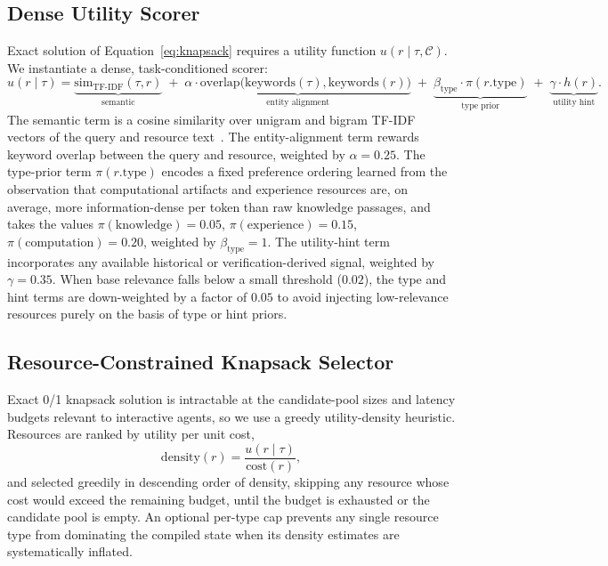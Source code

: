 \documentclass{article}
\begin{document}
\subsection{Dense Utility Scorer}
Exact solution of Equation~\eqref{eq:knapsack} requires a utility function $u(r \mid \tau, \mathcal{C})$. We instantiate a dense, task-conditioned scorer:
\begin{equation}
\label{eq:utility}
u(r \mid \tau) = \underbrace{\text{sim}_{\text{TF-IDF}}(\tau, r)}_{\text{semantic}} \;+\; \underbrace{\alpha \cdot \text{overlap}\big(\text{keywords}(\tau), \text{keywords}(r)\big)}_{\text{entity alignment}} \;+\; \underbrace{\beta_{\text{type}} \cdot \pi(r.\text{type})}_{\text{type prior}} \;+\; \underbrace{\gamma \cdot h(r)}_{\text{utility hint}}.
\end{equation}
The semantic term is a cosine similarity over unigram and bigram TF-IDF vectors of the query and resource text~\citep{pedregosa2011scikit}. The entity-alignment term rewards keyword overlap between the query and resource, weighted by $\alpha = 0.25$. The type-prior term $\pi(r.\text{type})$ encodes a fixed preference ordering learned from the observation that computational artifacts and experience resources are, on average, more information-dense per token than raw knowledge passages, and takes the values $\pi(\text{knowledge}) = 0.05$, $\pi(\text{experience}) = 0.15$, $\pi(\text{computation}) = 0.20$, weighted by $\beta_{\text{type}} = 1$. The utility-hint term incorporates any available historical or verification-derived signal, weighted by $\gamma = 0.35$. When base relevance falls below a small threshold ($0.02$), the type and hint terms are down-weighted by a factor of $0.05$ to avoid injecting low-relevance resources purely on the basis of type or hint priors.

\subsection{Resource-Constrained Knapsack Selector}
Exact 0/1 knapsack solution is intractable at the candidate-pool sizes and latency budgets relevant to interactive agents, so we use a greedy utility-density heuristic. Resources are ranked by utility per unit cost,
\begin{equation}
\label{eq:density}
\text{density}(r) = \frac{u(r \mid \tau)}{\text{cost}(r)},
\end{equation}
and selected greedily in descending order of density, skipping any resource whose cost would exceed the remaining budget, until the budget is exhausted or the candidate pool is empty. An optional per-type cap prevents any single resource type from dominating the compiled state when its density estimates are systematically inflated.
\end{document}
